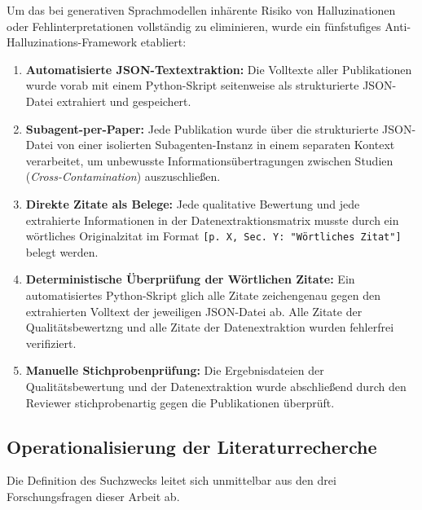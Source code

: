 Um das bei generativen Sprachmodellen inhärente Risiko von Halluzinationen oder Fehlinterpretationen vollständig zu eliminieren, wurde ein fünfstufiges Anti-Halluzinations-Framework etabliert:
\begin{enumerate}[label=(\alph*), leftmargin=*]
    \item \textbf{Automatisierte JSON-Textextraktion:} Die Volltexte aller Publikationen wurde vorab mit einem Python-Skript seitenweise als strukturierte JSON-Datei extrahiert und gespeichert.
    \item \textbf{Subagent-per-Paper:} Jede Publikation wurde über die strukturierte JSON-Datei von einer isolierten Subagenten-Instanz in einem separaten Kontext verarbeitet, um unbewusste Informationsübertragungen zwischen Studien (\textit{Cross-Contamination}) auszuschließen.
    \item \textbf{Direkte Zitate als Belege:} Jede qualitative Bewertung und jede extrahierte Informationen in der Datenextraktionsmatrix musste durch ein wörtliches Originalzitat im Format \texttt{[p.~X, Sec.~Y: "Wörtliches Zitat"]} belegt werden.
    \item \textbf{Deterministische Überprüfung der Wörtlichen Zitate:} Ein automatisiertes Python-Skript glich alle Zitate zeichengenau gegen den extrahierten Volltext der jeweiligen JSON-Datei ab. Alle Zitate der Qualitätsbewertzng und alle  Zitate der Datenextraktion wurden fehlerfrei verifiziert.
    \item \textbf{Manuelle Stichprobenprüfung:} Die Ergebnisdateien der Qualitätsbewertung und der Datenextraktion wurde abschließend durch den Reviewer stichprobenartig gegen die Publikationen überprüft.
\end{enumerate}

\subsection{Operationalisierung der Literaturrecherche}
\label{subsec:operationalisierung_recherche}

Die Definition des Suchzwecks leitet sich unmittelbar aus den drei Forschungsfragen dieser Arbeit ab.

